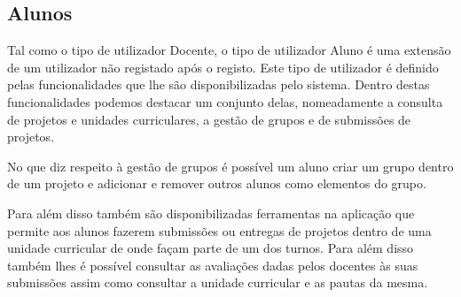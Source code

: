 \subsection{Alunos}

Tal como o tipo de utilizador Docente, o tipo de utilizador Aluno é uma extensão 
de um utilizador não registado após o registo. Este tipo de utilizador é 
definido pelas funcionalidades que lhe são disponibilizadas pelo sistema. Dentro 
destas funcionalidades podemos destacar um conjunto delas, nomeadamente a 
consulta de projetos e unidades curriculares, a gestão de grupos e de submissões de projetos.

No que diz respeito à gestão de grupos é possível um aluno criar um grupo dentro 
de um projeto e adicionar e remover outros alunos como elementos do grupo.

Para além disso também são disponibilizadas ferramentas na aplicação que permite 
aos alunos fazerem submissões ou entregas de projetos dentro de uma unidade 
curricular de onde façam parte de um dos turnos. Para além disso também lhes é 
possível consultar as avaliações dadas pelos docentes às suas submissões assim 
como consultar a unidade curricular e as pautas da mesma.
